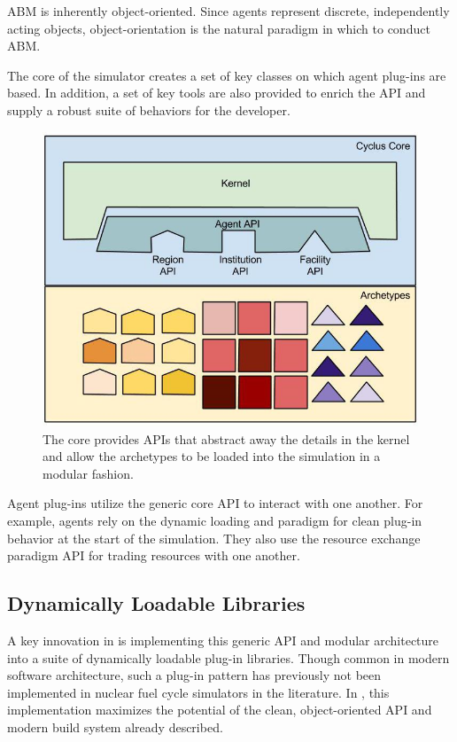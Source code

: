 \acrlong{ABM} is inherently object-oriented. Since agents represent 
discrete, independently acting objects, object-orientation is the natural 
paradigm in which to conduct \gls{ABM}.

The core of the \Cyclus simulator creates a set of key classes on which agent 
plug-ins 
are based. In addition, a set of key tools are also provided to enrich the 
\gls{API} and supply a robust suite of behaviors for the developer.


\begin{figure}[htbp!]
\begin{center}
\includegraphics[width=\textwidth]{./images/framework}
\end{center}
\caption{The \Cyclus core provides \gls{API}s that abstract away the details in 
the kernel and allow the archetypes to be loaded into the simulation in a modular 
fashion.}
\label{fig:framework}
\end{figure}

Agent plug-ins utilize the generic core \gls{API} to interact with one another.  For 
example, agents rely on the dynamic loading and paradigm for clean plug-in 
behavior at the start of the simulation. They also use the resource exchange 
paradigm \gls{API} for trading resources with one another. 


\subsection{Dynamically Loadable Libraries}

A key innovation in \Cyclus is implementing this generic \gls{API} and modular 
architecture into a suite of dynamically loadable plug-in libraries.  Though 
common in modern software architecture, such a plug-in pattern has 
previously not been implemented in nuclear fuel cycle simulators in the 
literature.  In \Cyclus, this implementation maximizes the potential of the clean, 
object-oriented \gls{API} and modern build system already described.

